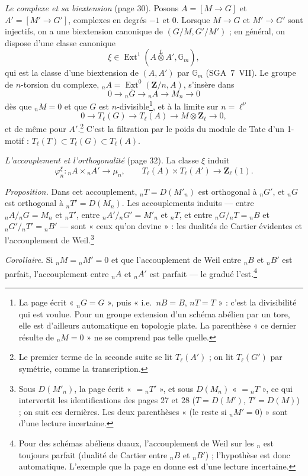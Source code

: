 \documentclass[11pt,a4paper]{article}
\begin{document}
\emph{Le complexe et sa biextension} (page 30). Posons $A = [M \to G]$ et $A' =
[M' \to G']$, complexes en degrés $-1$ et $0$. Lorsque $M \to G$ et $M' \to G'$
sont injectifs, on a une biextension canonique de $(G/M, G'/M')$ ; en général, on
dispose d'une classe canonique
\[ \xi \in \operatorname{Ext}^1(A \overset{L}{\otimes} A', \mathbb{G}_m), \]
qui est la classe d'une biextension de $(A, A')$ par $\mathbb{G}_m$ (SGA~7~VII).
Le groupe de $n$-torsion du complexe, ${}_nA = \underline{\operatorname{Ext}}^0
(\mathbf{Z}/n, A)$, s'insère dans
\[ 0 \to {}_nG \to {}_nA \to M_n \to 0 \]
dès que ${}_nM = 0$ et que $G$ est $n$-divisible\footnote{La page écrit
« ${}_nG = G$ », puis « i.e.\ $nB = B$, $nT = T$ » : c'est la divisibilité qui
est voulue. Pour un groupe extension d'un schéma abélien par un tore, elle est
d'ailleurs automatique en topologie plate. La parenthèse « ce dernier résulte de
${}_nM = 0$ » ne se comprend pas telle quelle.}, et à la limite sur $n =
\ell^\nu$
\[ 0 \to T_\ell(G) \to T_\ell(A) \to M \otimes \mathbf{Z}_\ell \to 0 , \]
et de même pour $A'$.\footnote{Le premier terme de la seconde suite se lit
$T_\ell(A')$ ; on lit $T_\ell(G')$ par symétrie, comme la transcription.} C'est
la filtration par le poids du module de Tate d'un 1-motif : $T_\ell(T) \subset
T_\ell(G) \subset T_\ell(A)$.

\emph{L'accouplement et l'orthogonalité} (page 32). La classe $\xi$ induit
\[ \varphi^\xi_n\colon {}_nA \times {}_nA' \to \mu_n , \qquad
T_\ell(A) \times T_\ell(A') \to \mathbf{Z}_\ell(1) . \]

\emph{Proposition.} Dans cet accouplement, ${}_nT = D(M'_n)$ est orthogonal à
${}_nG'$, et ${}_nG$ est orthogonal à ${}_nT' = D(M_n)$. Les accouplements induits
--- entre ${}_nA/{}_nG = M_n$ et ${}_nT'$, entre ${}_nA'/{}_nG' = M'_n$ et
${}_nT$, et entre ${}_nG/{}_nT = {}_nB$ et ${}_nG'/{}_nT' = {}_nB'$ --- sont
« ceux qu'on devine » : les dualités de Cartier évidentes et l'accouplement de
Weil.\footnote{Sous $D(M'_n)$, la page écrit « $= {}_nT'$ », et sous $D(M_n)$
« $= {}_nT$ », ce qui intervertit les identifications des pages 27 et 28
($T = D(M')$, $T' = D(M)$) ; on suit ces dernières. Les deux parenthèses « (le
reste si ${}_nM' = 0$) » sont d'une lecture incertaine.}

\emph{Corollaire.} Si ${}_nM = {}_nM' = 0$ et que l'accouplement de Weil entre
${}_nB$ et ${}_nB'$ est parfait, l'accouplement entre ${}_nA$ et ${}_nA'$ est
parfait --- le gradué l'est.\footnote{Pour des schémas abéliens duaux,
l'accouplement de Weil sur les ${}_n$ est toujours parfait (dualité de Cartier
entre ${}_nB$ et ${}_nB'$) ; l'hypothèse est donc automatique. L'exemple que la
page en donne est d'une lecture incertaine.}
\end{document}
